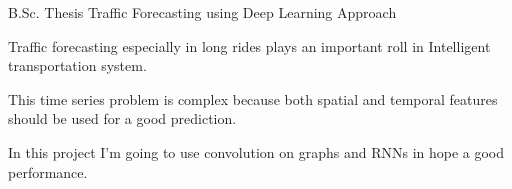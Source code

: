 \begin{cventries}
    \cventry
    {B.Sc. Thesis} %
    {Traffic Forecasting using Deep Learning Approach} %
    {} %
    {} %
    {
      \begin{cvitems} %
        \item{Traffic forecasting especially in long rides plays an important roll in Intelligent transportation system.}
        \item{This time series problem is complex because both spatial and temporal features should be used for a good prediction.}
        \item{In this project I'm going to use convolution on graphs and RNNs in hope a good performance.}
      \end{cvitems}
    }

\end{cventries}
